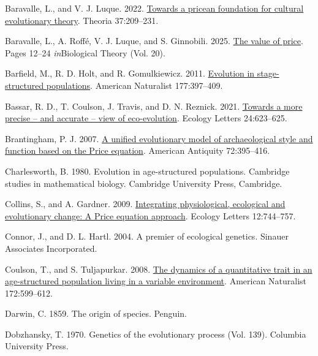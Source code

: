 \documentclass[
]{article}
\newlength{\cslhangindent}
\newenvironment{CSLReferences}[2] %
 {\begin{list}{}{%
  \setlength{\itemindent}{0pt}
  \setlength{\leftmargin}{0pt}
  \setlength{\parsep}{0pt}
  \ifodd #1
   \setlength{\leftmargin}{\cslhangindent}
   \setlength{\itemindent}{-1\cslhangindent}
  \fi
  \setlength{\itemsep}{#2\baselineskip}}}
 {\end{list}}
\begin{document}
\label{refs}
\begin{CSLReferences}{1}{0}
Baravalle, L., and V. J. Luque. 2022.
\href{https://doi.org/10.1387/theoria.21940}{Towards a pricean
foundation for cultural evolutionary theory}. Theoria 37:209--231.

Baravalle, L., A. Roffé, V. J. Luque, and S. Ginnobili. 2025.
\href{https://doi.org/10.1007/s13752-024-00482-4}{The value of price}.
Pages 12--24 \emph{in}Biological Theory (Vol. 20).

Barfield, M., R. D. Holt, and R. Gomulkiewicz. 2011.
\href{https://doi.org/10.1086/658903}{Evolution in stage-structured
populations}. American Naturalist 177:397--409.

Bassar, R. D., T. Coulson, J. Travis, and D. N. Reznick. 2021.
\href{https://doi.org/10.1111/ele.13712}{Towards a more precise -- and
accurate -- view of eco-evolution}. Ecology Letters 24:623--625.

Brantingham, P. J. 2007. \href{https://doi.org/10.2307/40035853}{{A
unified evolutionary model of archaeological style and function based on
the Price equation}}. American Antiquity 72:395--416.

Charlesworth, B. 1980. Evolution in age-structured populations.
Cambridge studies in mathematical biology. Cambridge University Press,
Cambridge.

Collins, S., and A. Gardner. 2009.
\href{https://doi.org/10.1111/j.1461-0248.2009.01340.x}{{Integrating
physiological, ecological and evolutionary change: A Price equation
approach}}. Ecology Letters 12:744--757.

Connor, J., and D. L. Hartl. 2004. {A premier of ecological genetics}.
Sinauer Associates Incorporated.

Coulson, T., and S. Tuljapurkar. 2008.
\href{https://doi.org/10.1086/591693}{The dynamics of a quantitative
trait in an age-structured population living in a variable environment}.
American Naturalist 172:599--612.

Darwin, C. 1859. The origin of species. Penguin.

Dobzhansky, T. 1970. Genetics of the evolutionary process (Vol. 139).
Columbia University Press.


\end{CSLReferences}
\end{document}
